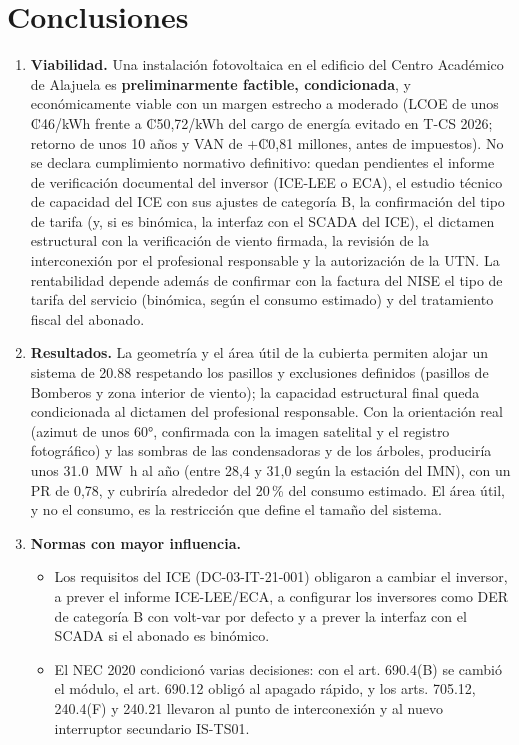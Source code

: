 \documentclass[12pt]{article}
\begin{document}
\section{Conclusiones}
\begin{enumerate}
\item \textbf{Viabilidad.} Una instalación fotovoltaica en el edificio del Centro Académico de Alajuela es \textbf{preliminarmente factible, condicionada}, y económicamente viable con un margen estrecho a moderado (LCOE de unos ₡46/kWh frente a ₡50,72/kWh del cargo de energía evitado en T-CS 2026; retorno de unos 10 años y VAN de +₡0,81 millones, antes de impuestos). No se declara cumplimiento normativo definitivo: quedan pendientes el informe de verificación documental del inversor (ICE-LEE o ECA), el estudio técnico de capacidad del ICE con sus ajustes de categoría B, la confirmación del tipo de tarifa (y, si es binómica, la interfaz con el SCADA del ICE), el dictamen estructural con la verificación de viento firmada, la revisión de la interconexión por el profesional responsable y la autorización de la UTN. La rentabilidad depende además de confirmar con la factura del NISE el tipo de tarifa del servicio (binómica, según el consumo estimado) y del tratamiento fiscal del abonado.
\item \textbf{Resultados.} La geometría y el área útil de la cubierta permiten alojar un sistema de \SI{20.88}{\kWp} respetando los pasillos y exclusiones definidos (pasillos de Bomberos y zona interior de viento); la capacidad estructural final queda condicionada al dictamen del profesional responsable. Con la orientación real (azimut de unos 60°, confirmada con la imagen satelital y el registro fotográfico) y las sombras de las condensadoras y de los árboles, produciría unos \SI{31.0}{\mega\watt\hour} al año (entre 28,4 y 31,0 según la estación del IMN), con un PR de 0,78, y cubriría alrededor del 20\,\% del consumo estimado. El área útil, y no el consumo, es la restricción que define el tamaño del sistema.
\item \textbf{Normas con mayor influencia.}
\begin{itemize}
\item Los requisitos del ICE (DC-03-IT-21-001) obligaron a cambiar el inversor, a prever el informe ICE-LEE/ECA, a configurar los inversores como DER de categoría B con volt-var por defecto y a prever la interfaz con el SCADA si el abonado es binómico.
\item El NEC 2020 condicionó varias decisiones: con el art. 690.4(B) se cambió el módulo, el art. 690.12 obligó al apagado rápido, y los arts. 705.12, 240.4(F) y 240.21 llevaron al punto de interconexión y al nuevo interruptor secundario IS-TS01.

\end{itemize}
\end{enumerate}
\end{document}
